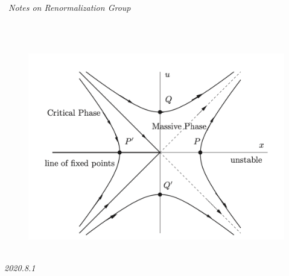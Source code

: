 \documentclass{ctexart}
\begin{document}
\begin{center}
~\\
\ \Huge{\textit{Notes on Renormalization Group}}\\
\end{center}
~\\
~\\
\begin{center}  %
    \begin{figure}[htpb]
    \begin{center}
       \includegraphics[width=14cm]{截屏2020-08-04 下午5.05.36.png}
    \end{center}
    \end{figure}
\end{center}
\begin{center}
    ~\\
        \huge{\textit{2020.8.1}}\\
    \end{center}\newpage
    \tableofcontents\newpage
\end{document}
